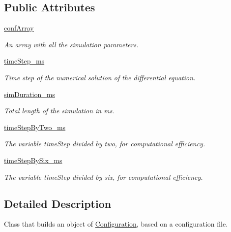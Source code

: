 \subsection*{Public Attributes}
\begin{DoxyCompactItemize}
\item 
\hyperlink{class_configuration_1_1_configuration_a2b8c2d210ef82ba5088de3c8c9a8725d}{conf\+Array}
\begin{DoxyCompactList}\small\item\em An array with all the simulation parameters. \end{DoxyCompactList}\item 
\hyperlink{class_configuration_1_1_configuration_a6379aaa6e54523ca81e3713d1846679b}{time\+Step\+\_\+ms}
\begin{DoxyCompactList}\small\item\em Time step of the numerical solution of the differential equation. \end{DoxyCompactList}\item 
\hyperlink{class_configuration_1_1_configuration_aea238884fe3daa1287aa069f35d4ad3e}{sim\+Duration\+\_\+ms}
\begin{DoxyCompactList}\small\item\em Total length of the simulation in ms. \end{DoxyCompactList}\item 
\hyperlink{class_configuration_1_1_configuration_a58f6e3bf5491f8fb229697fc3690aa12}{time\+Step\+By\+Two\+\_\+ms}
\begin{DoxyCompactList}\small\item\em The variable time\+Step divided by two, for computational efficiency. \end{DoxyCompactList}\item 
\hyperlink{class_configuration_1_1_configuration_aa49387a016f5d528136ab5812821cb99}{time\+Step\+By\+Six\+\_\+ms}
\begin{DoxyCompactList}\small\item\em The variable time\+Step divided by six, for computational efficiency. \end{DoxyCompactList}\end{DoxyCompactItemize}


\subsection{Detailed Description}
Class that builds an object of \hyperlink{class_configuration_1_1_configuration}{Configuration}, based on a configuration file. 

